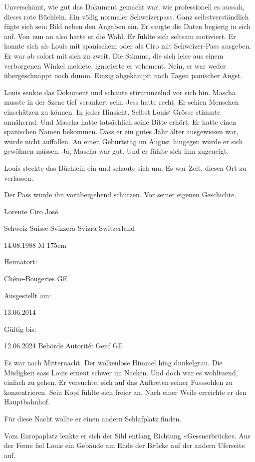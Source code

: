 Unverschämt, wie gut das Dokument gemacht war, wie professionell es
aussah, dieses rote Büchlein. Ein völlig normaler Schweizerpass. Ganz
selbstverständlich fügte sich sein Bild neben den Angaben ein. Er saugte
die Daten begierig in sich auf. Von nun an also hatte er die Wahl. Er
fühlte sich seltsam motiviert. Er konnte sich als Louis mit spanischem
oder als Ciro mit Schweizer-Pass ausgeben. Er war ab sofort mit sich zu
zweit. Die Stimme, die sich leise aus einem verborgenen Winkel meldete,
ignorierte er vehement. Nein, er war weder übergeschnappt noch dumm.
Einzig abgekämpft nach Tagen panischer Angst.

Louis senkte das Dokument und schaute stirnrunzelnd vor sich hin. Mascha
musste in der Szene tief verankert sein. Jess hatte recht. Er schien
Menschen einschätzen zu können. In jeder Hinsicht. Selbst Louis` Grösse
stimmte annähernd. Und Mascha hatte tatsächlich seine Bitte erhört. Er
hatte einen spanischen Namen bekommen. Dass er ein gutes Jahr älter
ausgewiesen war, würde nicht auffallen. An einen Geburtstag im August
hingegen würde er sich gewöhnen müssen. Ja, Mascha war gut. Und er
fühlte sich ihm zugeneigt.

Louis steckte das Büchlein ein und schaute sich um. Es war Zeit, diesen
Ort zu verlassen.

Der Pass würde ihn vorübergehend schützen. Vor seiner eigenen
Geschichte.

Lorente Ciro José

Schweiz Suisse Svizzera Svizra Switzerland

14.08.1988 M 175cm

Heimatort:

Chêne-Bougeries GE

Ausgestellt am:

13.06.2014

Gültig bis:

12.06.2024 Behörde Autorité: Genf GE

Es war nach Mitternacht. Der wolkenlose Himmel hing dunkelgrau. Die
Müdigkeit sass Louis erneut schwer im Nacken. Und doch war es wohltuend,
einfach zu gehen. Er versuchte, sich auf das Auftreten seiner Fusssohlen
zu konzentrieren. Sein Kopf fühlte sich freier an. Nach einer Weile
erreichte er den Hauptbahnhof.

Für diese Nacht wollte er einen andern Schlafplatz finden.

Vom Europaplatz lenkte er sich der Sihl entlang Richtung
«Gessnerbrücke». Aus der Ferne fiel Louis ein Gebäude am Ende der Brücke
auf der andern Uferseite auf.

